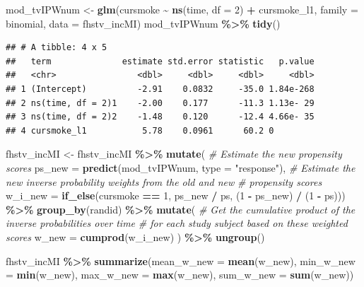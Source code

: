 \documentclass[
]{book}
\newenvironment{Shaded}{\begin{snugshade}}{\end{snugshade}}
\newcommand{\AttributeTok}[1]{\textcolor[rgb]{0.13,0.29,0.53}{#1}}
\newcommand{\CommentTok}[1]{\textcolor[rgb]{0.56,0.35,0.01}{\textit{#1}}}
\newcommand{\DecValTok}[1]{\textcolor[rgb]{0.00,0.00,0.81}{#1}}
\newcommand{\FunctionTok}[1]{\textcolor[rgb]{0.13,0.29,0.53}{\textbf{#1}}}
\newcommand{\NormalTok}[1]{#1}
\newcommand{\OtherTok}[1]{\textcolor[rgb]{0.56,0.35,0.01}{#1}}
\newcommand{\SpecialCharTok}[1]{\textcolor[rgb]{0.81,0.36,0.00}{\textbf{#1}}}
\newcommand{\StringTok}[1]{\textcolor[rgb]{0.31,0.60,0.02}{#1}}
\begin{document}
\begin{Shaded}
\begin{Highlighting}[]
\NormalTok{mod\_tvIPWnum }\OtherTok{\textless{}{-}} \FunctionTok{glm}\NormalTok{(cursmoke }\SpecialCharTok{\textasciitilde{}} \FunctionTok{ns}\NormalTok{(time, }\AttributeTok{df =} \DecValTok{2}\NormalTok{) }\SpecialCharTok{+}\NormalTok{ cursmoke\_l1, }
                    \AttributeTok{family =}\NormalTok{ binomial, }\AttributeTok{data =}\NormalTok{ fhstv\_incMI)}
\NormalTok{mod\_tvIPWnum }\SpecialCharTok{\%\textgreater{}\%}
  \FunctionTok{tidy}\NormalTok{()}
\end{Highlighting}
\end{Shaded}

\begin{verbatim}
## # A tibble: 4 x 5
##   term              estimate std.error statistic   p.value
##   <chr>                <dbl>     <dbl>     <dbl>     <dbl>
## 1 (Intercept)          -2.91    0.0832     -35.0 1.84e-268
## 2 ns(time, df = 2)1    -2.00    0.177      -11.3 1.13e- 29
## 3 ns(time, df = 2)2    -1.48    0.120      -12.4 4.66e- 35
## 4 cursmoke_l1           5.78    0.0961      60.2 0
\end{verbatim}

\begin{Shaded}
\begin{Highlighting}[]
\NormalTok{fhstv\_incMI }\OtherTok{\textless{}{-}}\NormalTok{ fhstv\_incMI }\SpecialCharTok{\%\textgreater{}\%}
  \FunctionTok{mutate}\NormalTok{(}
    \CommentTok{\# Estimate the new propensity scores}
    \AttributeTok{ps\_new =} \FunctionTok{predict}\NormalTok{(mod\_tvIPWnum, }\AttributeTok{type =} \StringTok{"response"}\NormalTok{), }
    \CommentTok{\# Estimate the new inverse probability weights from the old and new }
    \CommentTok{\# propensity scores}
    \AttributeTok{w\_i\_new =} \FunctionTok{if\_else}\NormalTok{(cursmoke }\SpecialCharTok{==} \DecValTok{1}\NormalTok{, ps\_new }\SpecialCharTok{/}\NormalTok{ ps, (}\DecValTok{1} \SpecialCharTok{{-}}\NormalTok{ ps\_new) }\SpecialCharTok{/}\NormalTok{ (}\DecValTok{1} \SpecialCharTok{{-}}\NormalTok{ ps))) }\SpecialCharTok{\%\textgreater{}\%} 
  \FunctionTok{group\_by}\NormalTok{(randid) }\SpecialCharTok{\%\textgreater{}\%}
  \FunctionTok{mutate}\NormalTok{(}
    \CommentTok{\# Get the cumulative product of the inverse probabilities over time}
    \CommentTok{\# for each study subject based on these weighted scores}
    \AttributeTok{w\_new =} \FunctionTok{cumprod}\NormalTok{(w\_i\_new)}
\NormalTok{  ) }\SpecialCharTok{\%\textgreater{}\%} 
  \FunctionTok{ungroup}\NormalTok{()}

\NormalTok{fhstv\_incMI }\SpecialCharTok{\%\textgreater{}\%}
  \FunctionTok{summarize}\NormalTok{(}\AttributeTok{mean\_w\_new =} \FunctionTok{mean}\NormalTok{(w\_new),}
            \AttributeTok{min\_w\_new =} \FunctionTok{min}\NormalTok{(w\_new),}
            \AttributeTok{max\_w\_new =} \FunctionTok{max}\NormalTok{(w\_new),}
            \AttributeTok{sum\_w\_new =} \FunctionTok{sum}\NormalTok{(w\_new))}
\end{Highlighting}
\end{Shaded}
\end{document}
